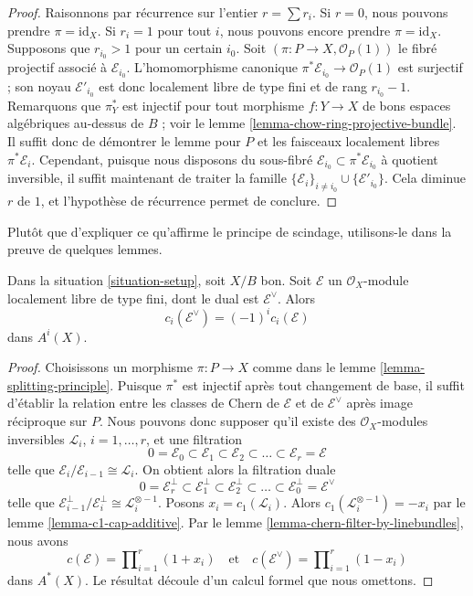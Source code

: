 \begin{proof}
Raisonnons par récurrence sur l'entier $r = \sum r_i$. Si $r = 0$, nous
pouvons prendre $\pi = \text{id}_X$. Si $r_i = 1$ pour tout $i$, nous pouvons
encore prendre $\pi = \text{id}_X$. Supposons que $r_{i_0} > 1$ pour un certain
$i_0$. Soit $(\pi : P \to X, \mathcal{O}_P(1))$ le fibré projectif associé à
$\mathcal{E}_{i_0}$. L'homomorphisme canonique $\pi^*\mathcal{E}_{i_0} \to
\mathcal{O}_P(1)$ est surjectif ; son noyau $\mathcal{E}'_{i_0}$ est donc
localement libre de type fini et de rang $r_{i_0} - 1$. Remarquons que
$\pi_Y^*$ est injectif pour tout morphisme $f : Y \to X$ de bons espaces
algébriques au-dessus de $B$ ; voir le lemme
\ref{lemma-chow-ring-projective-bundle}. Il suffit donc de démontrer le lemme
pour $P$ et les faisceaux localement libres $\pi^*\mathcal{E}_i$. Cependant,
puisque nous disposons du sous-fibré $\mathcal{E}_{i_0} \subset
\pi^*\mathcal{E}_{i_0}$ à quotient inversible, il suffit maintenant de traiter
la famille $\{\mathcal{E}_i\}_{i \not = i_0} \cup
\{\mathcal{E}'_{i_0}\}$. Cela diminue $r$ de $1$, et l'hypothèse de récurrence
permet de conclure.
\end{proof}

\noindent
Plutôt que d'expliquer ce qu'affirme le principe de scindage, utilisons-le
dans la preuve de quelques lemmes.

\begin{lemma}
\label{lemma-chern-classes-dual}
Dans la situation \ref{situation-setup}, soit $X/B$ bon. Soit $\mathcal{E}$ un
$\mathcal{O}_X$-module localement libre de type fini, dont le dual est
$\mathcal{E}^\vee$. Alors
$$
c_i(\mathcal{E}^\vee) = (-1)^i c_i(\mathcal{E})
$$
dans $A^i(X)$.
\end{lemma}

\begin{proof}
Choisissons un morphisme $\pi : P \to X$ comme dans le lemme
\ref{lemma-splitting-principle}. Puisque $\pi^*$ est injectif après tout
changement de base, il suffit d'établir la relation entre les classes de Chern
de $\mathcal{E}$ et de $\mathcal{E}^\vee$ après image réciproque sur $P$. Nous
pouvons donc supposer qu'il existe des $\mathcal{O}_X$-modules inversibles
${\mathcal L}_i$, $i = 1, \ldots, r$, et une filtration
$$
0 = \mathcal{E}_0 \subset \mathcal{E}_1 \subset \mathcal{E}_2
\subset \ldots \subset \mathcal{E}_r = \mathcal{E}
$$
telle que $\mathcal{E}_i/\mathcal{E}_{i - 1} \cong \mathcal{L}_i$. On obtient
alors la filtration duale
$$
0 = \mathcal{E}_r^\perp \subset \mathcal{E}_1^\perp \subset \mathcal{E}_2^\perp
\subset \ldots \subset \mathcal{E}_0^\perp = \mathcal{E}^\vee
$$
telle que $\mathcal{E}_{i - 1}^\perp/\mathcal{E}_i^\perp \cong
\mathcal{L}_i^{\otimes -1}$. Posons $x_i = c_1(\mathcal{L}_i)$. Alors
$c_1(\mathcal{L}_i^{\otimes -1}) = - x_i$ par le lemme
\ref{lemma-c1-cap-additive}. Par le lemme
\ref{lemma-chern-filter-by-linebundles}, nous avons
$$
c(\mathcal{E}) = \prod\nolimits_{i = 1}^r (1 + x_i)
\quad\text{et}\quad
c(\mathcal{E}^\vee) = \prod\nolimits_{i = 1}^r (1 - x_i)
$$
dans $A^*(X)$. Le résultat découle d'un calcul formel que nous omettons.
\end{proof}

